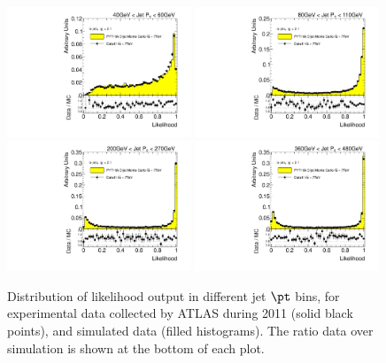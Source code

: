 \begin{figure}[tp]
\centering
\includegraphics[width=0.49\textwidth]{FIGS/dataMC/likelihood/FullMVAoutput_PT040.pdf}
\includegraphics[width=0.49\textwidth]{FIGS/dataMC/likelihood/FullMVAoutput_PT080.pdf}
\includegraphics[width=0.49\textwidth]{FIGS/dataMC/likelihood/FullMVAoutput_PT200.pdf}
\includegraphics[width=0.49\textwidth]{FIGS/dataMC/likelihood/FullMVAoutput_PT360.pdf}  
\caption{ Distribution of likelihood output in different jet $\pt$ bins, for experimental data  collected by ATLAS during 2011 (solid black points), and simulated data (filled histograms). The ratio data over simulation is shown at the bottom of each plot.}
\label{fig:datamcmva}
\end{figure}
